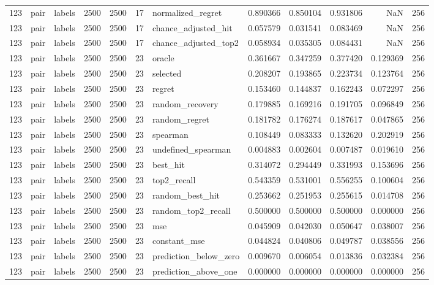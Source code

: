 \begin{tabular}{rllrrrlrrrrr}
123 & pair & labels & 2500 & 2500 & 17 & normalized_regret & 0.890366 & 0.850104 & 0.931806 & NaN & 256 \\
123 & pair & labels & 2500 & 2500 & 17 & chance_adjusted_hit & 0.057579 & 0.031541 & 0.083469 & NaN & 256 \\
123 & pair & labels & 2500 & 2500 & 17 & chance_adjusted_top2 & 0.058934 & 0.035305 & 0.084431 & NaN & 256 \\
123 & pair & labels & 2500 & 2500 & 23 & oracle & 0.361667 & 0.347259 & 0.377420 & 0.129369 & 256 \\
123 & pair & labels & 2500 & 2500 & 23 & selected & 0.208207 & 0.193865 & 0.223734 & 0.123764 & 256 \\
123 & pair & labels & 2500 & 2500 & 23 & regret & 0.153460 & 0.144837 & 0.162243 & 0.072297 & 256 \\
123 & pair & labels & 2500 & 2500 & 23 & random_recovery & 0.179885 & 0.169216 & 0.191705 & 0.096849 & 256 \\
123 & pair & labels & 2500 & 2500 & 23 & random_regret & 0.181782 & 0.176274 & 0.187617 & 0.047865 & 256 \\
123 & pair & labels & 2500 & 2500 & 23 & spearman & 0.108449 & 0.083333 & 0.132620 & 0.202919 & 256 \\
123 & pair & labels & 2500 & 2500 & 23 & undefined_spearman & 0.004883 & 0.002604 & 0.007487 & 0.019610 & 256 \\
123 & pair & labels & 2500 & 2500 & 23 & best_hit & 0.314072 & 0.294449 & 0.331993 & 0.153696 & 256 \\
123 & pair & labels & 2500 & 2500 & 23 & top2_recall & 0.543359 & 0.531001 & 0.556255 & 0.100604 & 256 \\
123 & pair & labels & 2500 & 2500 & 23 & random_best_hit & 0.253662 & 0.251953 & 0.255615 & 0.014708 & 256 \\
123 & pair & labels & 2500 & 2500 & 23 & random_top2_recall & 0.500000 & 0.500000 & 0.500000 & 0.000000 & 256 \\
123 & pair & labels & 2500 & 2500 & 23 & mse & 0.045909 & 0.042030 & 0.050647 & 0.038007 & 256 \\
123 & pair & labels & 2500 & 2500 & 23 & constant_mse & 0.044824 & 0.040806 & 0.049787 & 0.038556 & 256 \\
123 & pair & labels & 2500 & 2500 & 23 & prediction_below_zero & 0.009670 & 0.006054 & 0.013836 & 0.032384 & 256 \\
123 & pair & labels & 2500 & 2500 & 23 & prediction_above_one & 0.000000 & 0.000000 & 0.000000 & 0.000000 & 256 \\

\end{tabular}
